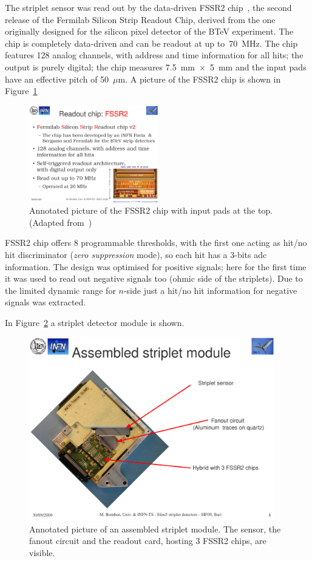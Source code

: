 The striplet sensor was read out by the data-driven FSSR2 chip~\cite{Re:2006zw}, 
the second release of the Fermilab Silicon Strip Readout Chip, derived from the one originally designed 
for the silicon pixel detector of the BTeV experiment. The chip is completely data-driven and can be 
readout at up to~70~MHz. The chip features 128 analog channels, with address and time information 
for all hits; the output is purely digital; the chip measures 7.5~mm~$\times$~5~mm and the input pads have an effective pitch of 50~$\mu$m. A picture of the FSSR2 chip is shown in Figure~\ref{fig:fssr2}


\begin{figure}[!htpb]
\centering
\includegraphics[width=0.5\textwidth]{fssr2.pdf}
\caption{\label{fig:fssr2}Annotated picture of the FSSR2 chip with input pads at the top. (Adapted from~\cite{Re:2006zw})}
\end{figure}


FSSR2 chip offers 8 programmable thresholds, with the first one acting as hit/no hit discriminator
({\it zero suppression} mode), 
so each hit has a 3-bits adc information. The design was optimised for positive signals; 
here for the first time it was used to read out negative signals too (ohmic side of the striplets). 
Due to the limited dynamic range for $n$-side just a hit/no hit information for negative signals was 
extracted.

In Figure~\ref{fig:assembled_striplets} a striplet detector module is shown.

\begin{figure}[!htpb]
\centering
\includegraphics[width=0.95\textwidth]{assembeld_striplets.pdf}
\caption{\label{fig:assembled_striplets}Annotated picture of an assembled striplet module. The 
sensor, the fanout circuit and the readout card, hosting 3 FSSR2 chips, are visible.}
\end{figure}

